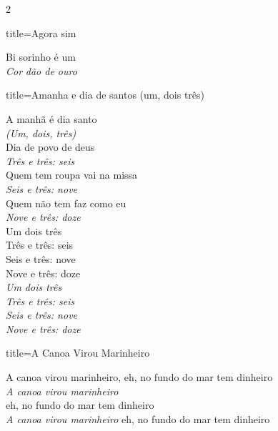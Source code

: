 \documentclass[fontsize=14pt, paper=a4, twoside, DIV=20]{scrreprt} %
\begin{document}
\begin{multicols*}{2}
\begin{song}{title={Agora sim}}
\begin{verse*}
Bi sorinho é um\\
\textit{Cor} \textit{dão de ouro}\\
\end{verse*}

\end{song}

\begin{song}{title={Amanha e dia de santos (um, dois três)}}

    \begin{verse*}
        A manhã é dia santo\\
         \textit{(Um, dois, três)}\\
        Dia de povo de deus\\
\textit{Três e três: seis}\\
Quem tem roupa vai na missa\\
\textit{Seis e três: nove}\\
Quem não tem faz como eu\\
\textit{Nove e três: doze}\\

Um dois três\\
Três e três: seis\\
Seis e três: nove\\
Nove e três: doze\\
\textit{Um dois três}\\
\textit{Três e três: seis}\\
\textit{Seis e três: nove}\\
\textit{Nove e três: doze}\\


\end{verse*}
\end{song}

\begin{song}{title={A Canoa Virou Marinheiro}}
        \begin{verse*}
                A  canoa virou marinheiro, eh, no fundo do mar tem dinheiro\\
                \textit{A canoa virou marinheiro}\\
                eh, no fundo do mar tem dinheiro\\
                \textit{A canoa virou marinheiro}
                eh, no fundo do mar tem dinheiro\\
           \end{verse*}
\end{song}


\end{multicols*}
\end{document}
